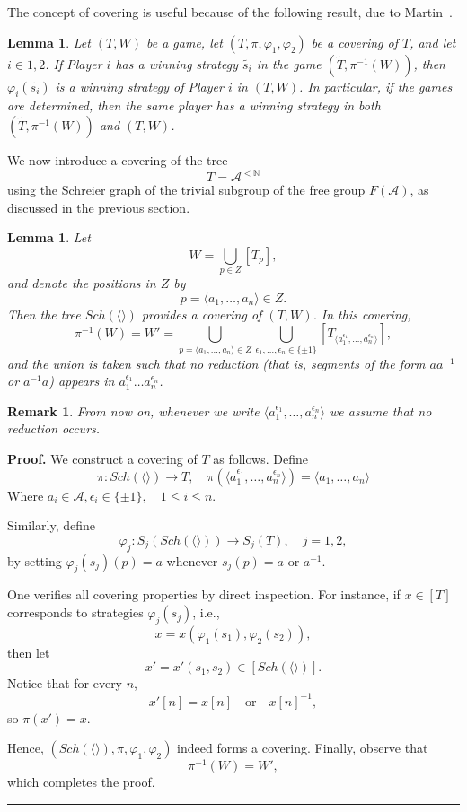 \documentclass[a4,12pt]{article}%
\newtheorem{lemma}[theorem]{Lemma}
\newtheorem{remark}[theorem]{Remark}
\newenvironment{proof}[1][Proof]{\textbf{#1.} }{\ \rule{0.5em}{0.5em}}
\begin{document}
The concept of covering is useful because of the following result, due to Martin~\cite{MartinCovering}.
\begin{lemma} \label{lemma: martin covering lemma}
    Let $(T, W)$ be a game, let $(T , \pi, \varphi_1 , \varphi_2 )$ be a covering
of $T$, and let $i \in {1,2}$. If Player $i$ has a winning strategy $\tilde{s_i}$ in the game $(\tilde{T} , \pi^{-1}(W))$, then $\varphi_i(\tilde{s_i})$ is a winning strategy of Player $i$ in $(T,W)$. In
particular, if the games are determined, then the same player has a winning strategy in both $(\tilde{T},\pi^{-1}(W))$ and $(T,W)$.

\end{lemma}

We now introduce a covering of the tree 
\[
T = \mathcal A^{<\mathbb N}
\] 
using the Schreier graph of the trivial subgroup of the free group $F(\mathcal A)$, as discussed in the previous section.

\begin{lemma} \label{lemma: covering by schreier graph}
Let 
\[
W = \bigcup_{p \in Z} [T_p],
\] 
and denote the positions in $Z$ by 
\[
p = \langle a_1,\dots,a_{n} \rangle \in Z.
\]  
Then the tree $Sch(\langle \rangle)$ provides a covering of $(T,W)$.  
In this covering, 
\[
\pi^{-1}(W) = W' = \bigcup_{p = \langle a_1,...,a_n \rangle \in Z} \bigcup_{\epsilon_1,\dots,\epsilon_{n} \in \{\pm 1\}} [T_{\langle a_1^{\epsilon_1},\dots,a_{n}^{\epsilon_{n}} \rangle}],
\]
and the union is taken such that no reduction (that is, segments of the form $aa^{-1}$ or $a^{-1}a$) appears in $a_1^{\epsilon_1}\dots a_{n}^{\epsilon_{n}}$.
\end{lemma}

\begin{remark}
    From now on, whenever we write $\langle a_1^{\epsilon_1},\dots,a_{n}^{\epsilon_{n}} \rangle$ we assume that no reduction occurs.
\end{remark}
\begin{proof}
We construct a covering of $T$ as follows. Define 
\[
\pi : Sch(\langle \rangle) \to T, \quad \pi(\langle a_1^{\epsilon_1},\dots,a_{n}^{\epsilon_{n}}\rangle) = \langle a_1,\dots,a_{n}\rangle
\] 
Where $a_i \in \mathcal{A}, \epsilon_i \in \{\pm 1\}, \quad 1\le i \le n$.

Similarly, define 
\[
\varphi_j : S_j(Sch(\langle \rangle)) \to S_j(T), \quad j=1,2,
\] 
by setting $\varphi_j(s_j)(p) = a$ whenever $s_j(p) = a$ or $a^{-1}$.

One verifies all covering properties by direct inspection. For instance, if $x \in [T]$ corresponds to strategies $\varphi_j(s_j)$, i.e., 
\[
x = x(\varphi_1(s_1), \varphi_2(s_2)),
\] 
then let 
\[
x' = x'(s_1, s_2) \in [Sch(\langle \rangle)].
\] 
Notice that for every $n$, 
\[
x'[n] = x[n] \quad \text{or} \quad x[n]^{-1},
\] 
so $\pi(x') = x$.  

Hence, $(Sch(\langle \rangle), \pi, \varphi_1, \varphi_2)$ indeed forms a covering.   
Finally, observe that 
\[
\pi^{-1}(W) = W',
\] 
which completes the proof.
\end{proof}
\end{document}
